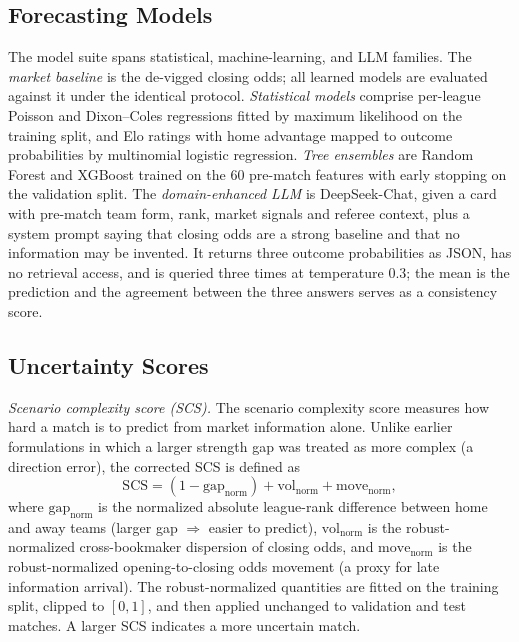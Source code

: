 \documentclass[10pt]{article}
\begin{document}
\subsection{Forecasting Models}
\label{sec:models}
The model suite spans statistical, machine-learning, and LLM families. The \emph{market baseline} is the de-vigged
closing odds; all learned models are evaluated against it under the identical
protocol. \emph{Statistical models} comprise per-league Poisson and Dixon--Coles
regressions fitted by maximum likelihood on the training split, and Elo ratings
with home advantage mapped to outcome probabilities by multinomial logistic
regression. \emph{Tree ensembles} are Random Forest and XGBoost trained on the
60 pre-match features with early stopping on the validation split. The \emph{domain-enhanced LLM} is DeepSeek-Chat, given a card with pre-match
team form, rank, market signals and referee context, plus a system prompt saying
that closing odds are a strong baseline and that no information may be invented.
It returns three outcome probabilities as JSON, has no retrieval access, and is
queried three times at temperature 0.3; the mean is the prediction and the
agreement between the three answers serves as a consistency score.

\subsection{Uncertainty Scores}
\label{sec:unc}
\emph{Scenario complexity score (SCS).} The scenario complexity score measures
how hard a match is to predict from market information alone. Unlike earlier
formulations in which a larger strength gap was treated as more complex (a
direction error), the corrected SCS is defined as
\begin{equation}
  \mathrm{SCS} = (1 - \mathrm{gap}_{\mathrm{norm}}) + \mathrm{vol}_{\mathrm{norm}}
  + \mathrm{move}_{\mathrm{norm}},
\label{eq:scs}
\end{equation}
where $\mathrm{gap}_{\mathrm{norm}}$ is the normalized absolute league-rank
difference between home and away teams (larger gap $\Rightarrow$ easier to
predict), $\mathrm{vol}_{\mathrm{norm}}$ is the robust-normalized
cross-bookmaker dispersion of closing odds, and
$\mathrm{move}_{\mathrm{norm}}$ is the robust-normalized opening-to-closing
odds movement (a proxy for late information arrival). The robust-normalized
quantities are fitted on the training split, clipped to $[0,1]$, and then
applied unchanged to validation and test matches. A larger SCS indicates a more
uncertain match.
\end{document}

